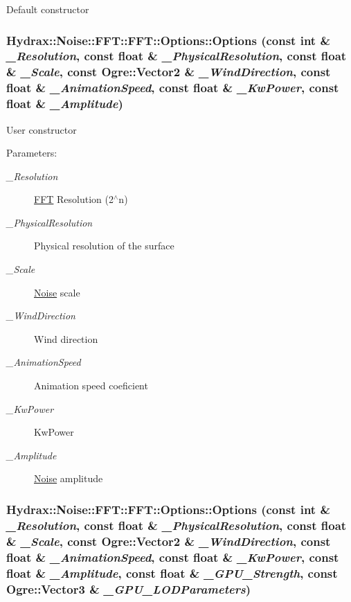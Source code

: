 Default constructor \hypertarget{struct_hydrax_1_1_noise_1_1_f_f_t_1_1_options_7c9613db2f0a0a9037c1aaf713bb1d91}{
\subsubsection[{Options}]{\setlength{\rightskip}{0pt plus 5cm}Hydrax::Noise::FFT::FFT::Options::Options (const int \& {\em \_\-Resolution}, \/  const float \& {\em \_\-PhysicalResolution}, \/  const float \& {\em \_\-Scale}, \/  const Ogre::Vector2 \& {\em \_\-WindDirection}, \/  const float \& {\em \_\-AnimationSpeed}, \/  const float \& {\em \_\-KwPower}, \/  const float \& {\em \_\-Amplitude})}}
\label{struct_hydrax_1_1_noise_1_1_f_f_t_1_1_options_7c9613db2f0a0a9037c1aaf713bb1d91}


User constructor \begin{Desc}
\item[Parameters:]
\begin{description}
\item[{\em \_\-Resolution}]\hyperlink{class_hydrax_1_1_noise_1_1_f_f_t}{FFT} Resolution (2$^\wedge$n) \item[{\em \_\-PhysicalResolution}]Physical resolution of the surface \item[{\em \_\-Scale}]\hyperlink{class_hydrax_1_1_noise_1_1_noise}{Noise} scale \item[{\em \_\-WindDirection}]Wind direction \item[{\em \_\-AnimationSpeed}]Animation speed coeficient \item[{\em \_\-KwPower}]KwPower \item[{\em \_\-Amplitude}]\hyperlink{class_hydrax_1_1_noise_1_1_noise}{Noise} amplitude \end{description}
\end{Desc}
\hypertarget{struct_hydrax_1_1_noise_1_1_f_f_t_1_1_options_28e1e4f8ce5958e56094139d4f7fd569}{
\subsubsection[{Options}]{\setlength{\rightskip}{0pt plus 5cm}Hydrax::Noise::FFT::FFT::Options::Options (const int \& {\em \_\-Resolution}, \/  const float \& {\em \_\-PhysicalResolution}, \/  const float \& {\em \_\-Scale}, \/  const Ogre::Vector2 \& {\em \_\-WindDirection}, \/  const float \& {\em \_\-AnimationSpeed}, \/  const float \& {\em \_\-KwPower}, \/  const float \& {\em \_\-Amplitude}, \/  const float \& {\em \_\-GPU\_\-Strength}, \/  const Ogre::Vector3 \& {\em \_\-GPU\_\-LODParameters})}}
\label{struct_hydrax_1_1_noise_1_1_f_f_t_1_1_options_28e1e4f8ce5958e56094139d4f7fd569}


